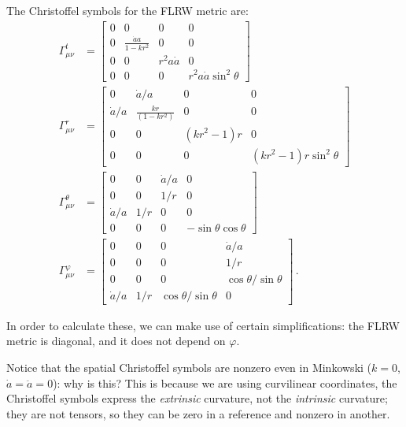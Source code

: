 \documentclass[main.tex]{subfiles}
\begin{document}
\begin{claim}
The Christoffel symbols for the FLRW metric are: 
%
\begin{align}
\Gamma^{t}_{\mu \nu } &= \left[\begin{array}{cccc}
0 & 0 & 0 & 0 \\ 
0 & \frac{\dot{a}a}{1-kr^2} & 0 & 0 \\ 
0 & 0 & r^2a \dot{a} & 0 \\ 
0 & 0 & 0 & r^2 a \dot{a} \sin^2\theta 
\end{array}\right] \\
\Gamma^{r}_{\mu \nu } &= \left[\begin{array}{cccc}
0 & \dot{a} / a & 0 & 0 \\ 
\dot{a} / a & \frac{kr}{(1-kr^2)} & 0 & 0 \\ 
0 & 0 & (kr^2-1)r & 0 \\ 
0 & 0 & 0 & (kr^2-1)r \sin^2\theta 
\end{array}\right] \\
\Gamma^{\theta }_{\mu \nu } &= \left[\begin{array}{cccc}
0 & 0 & \dot{a} / a & 0 \\ 
0 & 0 & 1 / r & 0 \\ 
\dot{a} / a & 1/r & 0 & 0 \\ 
0 & 0 & 0 & - \sin \theta \cos \theta 
\end{array}\right] \\
\Gamma^{\varphi }_{\mu \nu } &= \left[\begin{array}{cccc}
0 & 0 & 0 & \dot{a} / a \\ 
0 & 0 & 0 & 1/r \\ 
0 & 0 & 0 & \cos \theta  /\sin \theta  \\ 
\dot{a} /a  & 1/r & \cos \theta  /\sin \theta  & 0
\end{array}\right]
\,.
\end{align}
\end{claim}

In order to calculate these, we can make use of certain simplifications: the FLRW metric is diagonal, and it does not depend on \(\varphi \).

Notice that the spatial Christoffel symbols are nonzero even in Minkowski (\(k=0\), \(\dot{a} = \ddot{a} =  0\)): why is this?
This is because we are using curvilinear coordinates, the Christoffel symbols express the \emph{extrinsic} curvature, not the \emph{intrinsic} curvature; they are not tensors, so they can be zero in a reference and nonzero in another. 
\end{document}
